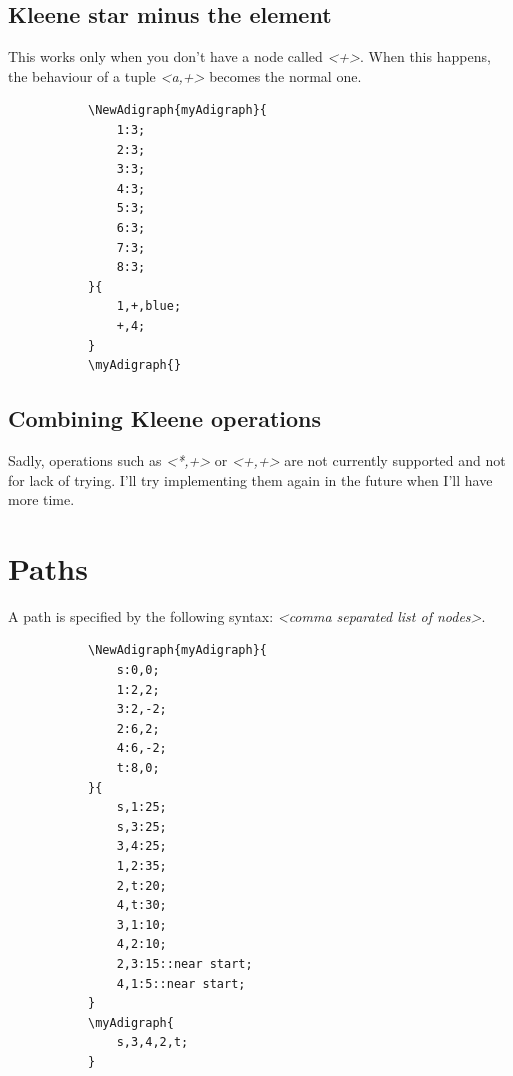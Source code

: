 \documentclass{report}
\begin{document}
\subsection{Kleene star minus the element}
This works only when you don't have a node called \textit{<+>}. When this happens, the behaviour of a tuple \textit{<a,+>} becomes the normal one.
\begin{figure}
	\begin{subfigure}{0.49\textwidth}
		\begin{verbatim}
\NewAdigraph{myAdigraph}{
	1:3;
	2:3;
	3:3;
	4:3;
	5:3;
	6:3;
	7:3;
	8:3;
}{
	1,+,blue;
	+,4;
}
\myAdigraph{}
\end{verbatim}
	\end{subfigure}
	\begin{subfigure}{0.49\textwidth}
		\myAdigraph{}
	\end{subfigure}
\end{figure}


\subsection{Combining Kleene operations}
Sadly, operations such as \textit{<*,+>} or \textit{<+,+>} are not currently supported and not for lack of trying. I'll try implementing them again in the future when I'll have more time.

\section{Paths}
A path is specified by the following syntax: \textit{<comma separated list of nodes>}.


\begin{figure}
	\begin{subfigure}{0.49\textwidth}
		\begin{verbatim}
\NewAdigraph{myAdigraph}{
	s:0,0;
	1:2,2;
	3:2,-2;
	2:6,2;
	4:6,-2;
	t:8,0;
}{
	s,1:25;
	s,3:25;
	3,4:25;
	1,2:35;
	2,t:20;
	4,t:30;
	3,1:10;
	4,2:10;
	2,3:15::near start;
	4,1:5::near start;
}
\myAdigraph{
	s,3,4,2,t;
}
\end{verbatim}
	\end{subfigure}
	\begin{subfigure}{0.49\textwidth}
	\end{subfigure}
\end{figure}
\end{document}
